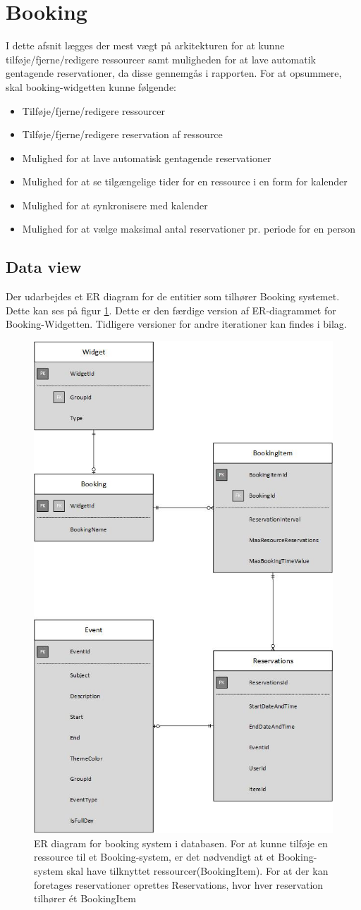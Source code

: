 \section{Booking}
I dette afsnit lægges der mest vægt på arkitekturen for at kunne tilføje/fjerne/redigere ressourcer samt muligheden for at lave automatik gentagende reservationer, da disse gennemgås i rapporten. For at opsummere, skal booking-widgetten kunne følgende:
\begin{itemize}
    \item Tilføje/fjerne/redigere ressourcer
    \item Tilføje/fjerne/redigere reservation af ressource
    \item Mulighed for at lave automatisk gentagende reservationer
    \item Mulighed for at se tilgængelige tider for en ressource i en form for kalender
    \item Mulighed for at synkronisere med kalender
    \item Mulighed for at vælge maksimal antal reservationer pr. periode for en person
\end{itemize}

\subsection{Data view}
Der udarbejdes et ER diagram for de entitier som tilhører Booking systemet. Dette kan ses på figur \ref{fig:Booking_ER}. Dette er den færdige version af ER-diagrammet for Booking-Widgetten. Tidligere versioner for andre iterationer kan findes i bilag. 
\begin{figure}[H]
\centering
  \includegraphics[width=0.5\linewidth]{01_Billeder/09_Arkitektur/Booking.jpg}
  \caption{ER diagram for booking system i databasen. For at kunne tilføje en ressource til et Booking-system, er det nødvendigt at et Booking-system skal have tilknyttet ressourcer(BookingItem). For at der kan foretages reservationer oprettes Reservations, hvor hver reservation tilhører ét BookingItem}
  \label{fig:Booking_ER}
\end{figure}

